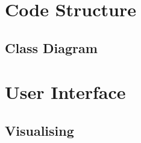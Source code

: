 
\section{Code Structure}


\subsection{Class Diagram}

\section{User Interface}


\subsection{Visualising}









 
